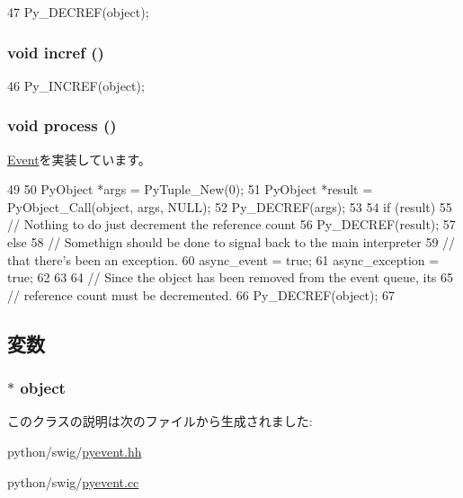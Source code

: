 \begin{DoxyCode}
47 { Py_DECREF(object); }
\end{DoxyCode}
\hypertarget{classPythonEvent_ad16d34c97e8d6a988fd2b5ea36bccbf4}{
\subsubsection[{incref}]{\setlength{\rightskip}{0pt plus 5cm}void incref ()}}
\label{classPythonEvent_ad16d34c97e8d6a988fd2b5ea36bccbf4}



\begin{DoxyCode}
46 { Py_INCREF(object); }
\end{DoxyCode}
\hypertarget{classPythonEvent_a2e9c5136d19b1a95fc427e0852deab5c}{
\subsubsection[{process}]{\setlength{\rightskip}{0pt plus 5cm}void process ()}}
\label{classPythonEvent_a2e9c5136d19b1a95fc427e0852deab5c}


\hyperlink{classEvent_a142b75b68a6291400e20fb0dd905b1c8}{Event}を実装しています。


\begin{DoxyCode}
49 {
50     PyObject *args = PyTuple_New(0);
51     PyObject *result = PyObject_Call(object, args, NULL);
52     Py_DECREF(args);
53 
54     if (result) {
55         // Nothing to do just decrement the reference count
56         Py_DECREF(result);
57     } else {
58         // Somethign should be done to signal back to the main interpreter
59         // that there's been an exception.
60         async_event = true;
61         async_exception = true;
62     }
63 
64     // Since the object has been removed from the event queue, its
65     // reference count must be decremented.
66     Py_DECREF(object);
67 }
\end{DoxyCode}


\subsection{変数}
\hypertarget{classPythonEvent_adb7ba59fec8a5847f73c56fccee0f1a0}{
\subsubsection[{object}]{$\ast$ {\bf object}}}
\label{classPythonEvent_adb7ba59fec8a5847f73c56fccee0f1a0}


このクラスの説明は次のファイルから生成されました:\begin{DoxyCompactItemize}
\item 
python/swig/\hyperlink{pyevent_8hh}{pyevent.hh}\item 
python/swig/\hyperlink{pyevent_8cc}{pyevent.cc}\end{DoxyCompactItemize}
